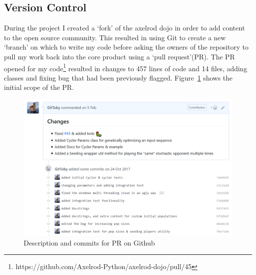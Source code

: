 \subsection{Version Control}
During the project I created a `fork' of the axelrod dojo in order to add content to the open source community. 
This resulted in using Git to create a new `branch' on which to write my code before asking the owners of the repository to pull my work back into the core product using a `pull request'(PR).
The PR opened for my code\footnote{https://github.com/Axelrod-Python/axelrod-dojo/pull/45} resulted in changes to 457 lines of code and 14 files, adding classes and fixing bug that had been previously flagged.
Figure~\ref{fig:PR-open} shows the initial scope of the PR.
\begin{figure}[ht]
    \includegraphics[width=1.0\textwidth, center]{./img/vcs/PR-Open.png}
    \caption{Description and commits for PR on Github}\label{fig:PR-open}
\end{figure}
